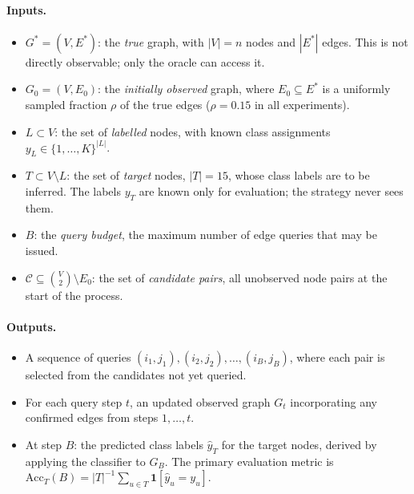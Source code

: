 \documentclass[11pt,a4paper]{article}
\begin{document}
\paragraph{Inputs.}
\begin{itemize}[leftmargin=2em]
\item $G^* = (V, E^*)$: the \emph{true} graph, with $|V| = n$ nodes and $|E^*|$ edges. This
is not directly observable; only the oracle can access it.
\item $G_0 = (V, E_0)$: the \emph{initially observed} graph, where $E_0 \subseteq E^*$ is a
uniformly sampled fraction $\rho$ of the true edges ($\rho = 0.15$ in all experiments).
\item $L \subset V$: the set of \emph{labelled} nodes, with known class assignments $y_L
\in \{1, \dots, K\}^{|L|}$.
\item $T \subset V \setminus L$: the set of \emph{target} nodes, $|T| = 15$, whose class
labels are to be inferred. The labels $y_T$ are known only for evaluation; the strategy never
sees them.
\item $B$: the \emph{query budget}, the maximum number of edge queries that may be issued.
\item $\mathcal{C} \subseteq \binom{V}{2} \setminus E_0$: the set of \emph{candidate pairs},
all unobserved node pairs at the start of the process.
\end{itemize}

\paragraph{Outputs.}
\begin{itemize}[leftmargin=2em]
\item A sequence of queries $(i_1, j_1), (i_2, j_2), \dots, (i_B, j_B)$, where each pair is
selected from the candidates not yet queried.
\item For each query step $t$, an updated observed graph $G_t$ incorporating any confirmed
edges from steps $1, \dots, t$.
\item At step $B$: the predicted class labels $\hat{y}_T$ for the target nodes, derived by
applying the classifier to $G_B$. The primary evaluation metric is
$\mathrm{Acc}_T(B) = |T|^{-1} \sum_{u \in T} \mathbf{1}[\hat{y}_u = y_u]$.
\end{itemize}
\end{document}

